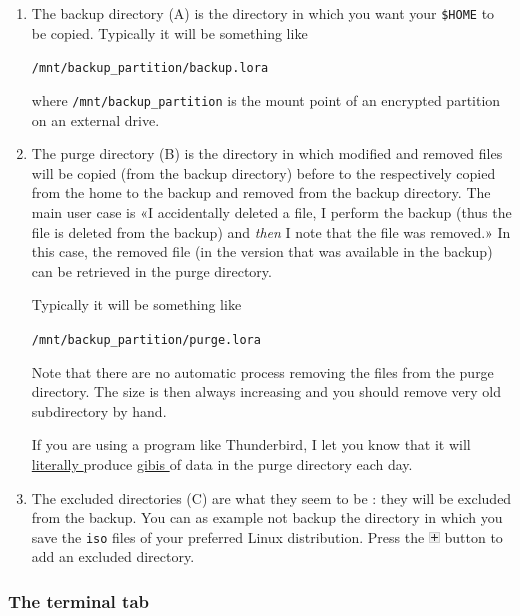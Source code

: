 \documentclass[a4paper,12pt]{article}
\newcommand{\info}[1]{\texttt{#1}}
\begin{document}
\begin{enumerate}
    \item
        The backup directory (A) is the directory in which you want your \info{\$HOME} to be copied. Typically it will be something like
        \begin{center}
            \info{/mnt/backup\_partition/backup.lora}
        \end{center}
        where \info{/mnt/backup\_partition} is the mount point of an encrypted partition on an external drive.
    \item
        The purge directory (B) is the directory in which modified and removed files will be copied (from the backup directory) before to the respectively copied from the home to the backup and removed from the backup directory. The main user case is «I accidentally deleted a file, I perform the backup (thus the file is deleted from the backup) and \emph{then} I note that the file was removed.»  In this case, the removed file (in the version that was available in the backup) can be retrieved in the purge directory.

        Typically it will be something like
        \begin{center}
            \info{/mnt/backup\_partition/purge.lora}
        \end{center}

        Note that there are no automatic process removing the files from the purge directory. The size is then always increasing and you should remove very old subdirectory by hand.

        If you are using a program like Thunderbird, I let you know that it will \href{ http://xkcd.com/725/ }{ literally } produce \href{ https://fr.wikipedia.org/wiki/Gibioctet }{ gibis } of data in the purge directory each day.
    \item
        The excluded directories (C) are what they seem to be : they will be excluded from the backup. You can as example not backup the directory in which you save the \info{iso} files of your preferred Linux distribution. Press the \includegraphics{plus.png} button to add an excluded directory.
\end{enumerate}


\subsubsection{The terminal tab}
\end{document}
